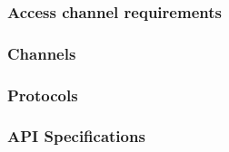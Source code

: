 \subsubsection{Access channel requirements}

\subsubsection{Channels}

\subsubsection{Protocols}

\subsubsection{API Specifications}
